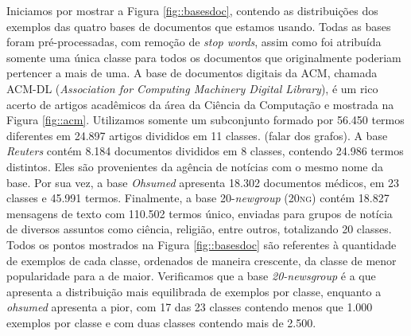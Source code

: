 Iniciamos por mostrar a Figura \ref{fig::basesdoc}, contendo as distribuições dos exemplos das quatro bases de documentos que estamos usando. Todas as bases foram pré-processadas, com remoção de \textit{stop words}, assim como foi atribuída somente uma única classe para todos os documentos que originalmente poderiam pertencer a mais de uma.
A base de documentos digitais da \textsc{ACM}, chamada \textsc{ACM-DL} (\textit{Association for Computing Machinery Digital Library}), é um rico acerto de artigos acadêmicos da área da Ciência da Computação e mostrada na Figura \ref{fig::acm}. Utilizamos somente um subconjunto formado por 56.450 termos diferentes em 24.897 artigos divididos em 11 classes. (falar dos grafos).
A base \textit{Reuters} contém 8.184 documentos divididos em 8 classes, contendo 24.986 termos distintos. Eles são provenientes da agência de notícias com o mesmo nome da base. 
Por sua vez, a base \textit{Ohsumed} apresenta 18.302 documentos médicos, em 23 classes e 45.991 termos.
Finalmente, a base 20-\textit{newgroup} (\textsc{20ng}) contém 18.827 mensagens de texto com 110.502 termos único, enviadas para grupos de notícia de diversos assuntos como ciência, religião, entre outros, totalizando 20 classes.
Todos os pontos mostrados na Figura \ref{fig::basesdoc} são referentes à quantidade de exemplos de cada classe, ordenados de maneira crescente, da classe de menor popularidade para a de maior. Verificamos que a base \textit{20-newsgroup} é a que apresenta a distribuição mais equilibrada de exemplos por classe, enquanto a \textit{ohsumed} apresenta a pior, com 17 das 23 classes contendo menos que 1.000 exemplos por classe e com duas classes contendo mais de 2.500.


